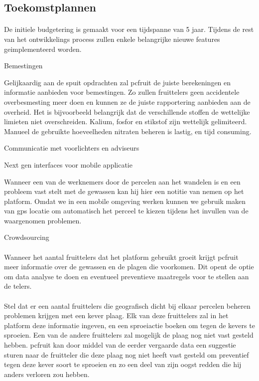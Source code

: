 \subsection {Toekomstplannen}

\paragraph {} De initiele budgetering is gemaakt voor een tijdspanne van 5 jaar. Tijdens de rest van
het ontwikkelings process zullen enkele belangrijke nieuwe features geimplementeerd
worden.

Bemestingen

Gelijkaardig aan de spuit opdrachten zal pcfruit de juiste berekeningen en informatie
aanbieden voor bemestingen. Zo zullen fruittelers geen accidentele overbesmesting meer doen en
kunnen ze de juiste rapportering aanbieden aan de overheid. Het is bijvoorbeeld
belangrijk dat de verschillende stoffen de wettelijke limieten niet overschreiden.
Kalium, fosfor en stikstof zijn wettelijk gelimiteerd. Manueel de gebruikte hoeveelheden
nitraten beheren is lastig, en tijd consuming.

Communicatie met voorlichters en adviseurs

Next gen interfaces voor mobile applicatie

Wanneer een van de werknemers door de percelen aan het wandelen is en een probleem vast
stelt met de gewassen kan hij hier een notitie van nemen op het platform. Omdat we in een
mobile omgeving werken kunnen we gebruik maken van gps locatie om automatisch het perceel
te kiezen tijdens het invullen van de waargenomen problemen.

Crowdsourcing

\paragraph {} Wanneer het aantal fruittelers dat het platform gebruikt groeit krijgt pcfruit
meer informatie over de gewassen en de plagen die voorkomen. Dit opent de optie om data
analyse te doen en eventueel preventieve maatregels voor te stellen aan de telers.

\paragraph {} Stel dat er een aantal fruittelers die geografisch dicht bij elkaar percelen
beheren problemen krijgen met een kever plaag. Elk van deze fruittelers zal in het platform
deze informatie ingeven, en een sproeiactie boeken om tegen de kevers te sproeien. Een van
de andere fruittelers zal mogelijk de plaag nog niet vast gesteld hebben. pcfruit kan door
middel van de eerder vergaarde data een suggestie sturen naar de fruitteler die deze plaag nog
niet heeft vast gesteld om preventief tegen deze kever soort te sproeien en zo een deel
van zijn oogst redden die hij anders verloren zou hebben.

